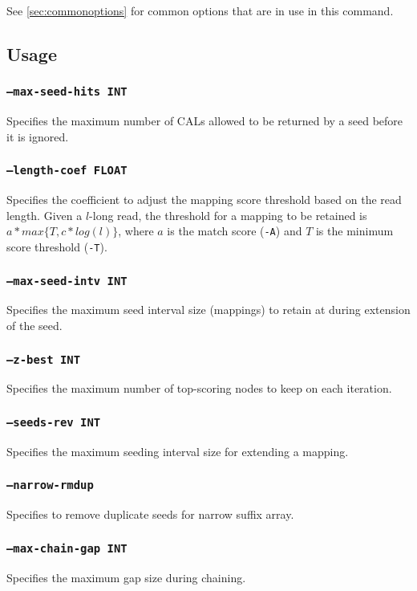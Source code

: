 \documentclass[a4paper,12pt]{book}
\newcommand{\TT}[1]{{\tt #1}} %
\begin{document}
See \autoref{sec:commonoptions} for common options that are in use in this command.

\subsection{Usage}

\subsubsection{\TT{--max-seed-hits INT}}
Specifies the maximum number of CALs allowed to be returned by a seed before it is ignored.

\subsubsection{\TT{--length-coef FLOAT}}
Specifies the coefficient to adjust the mapping score threshold based on the read length.
Given a $l$-long read, the threshold for a mapping to be retained is $a*max\{T,c*log(l)\}$, where $a$ is the match score (\TT{-A}) and $T$ is the minimum score threshold (\TT{-T}).

\subsubsection{\TT{--max-seed-intv INT}}
Specifies the maximum seed interval size (mappings) to retain at during extension of the seed.

\subsubsection{\TT{--z-best INT}}
Specifies the maximum number of top-scoring nodes to keep on each iteration.

\subsubsection{\TT{--seeds-rev INT}}
Specifies the maximum seeding interval size for extending a mapping.

\subsubsection{\TT{--narrow-rmdup}}
Specifies to remove duplicate seeds for narrow suffix array.

\subsubsection{\TT{--max-chain-gap INT}}
Specifies the maximum gap size during chaining.
\end{document}
